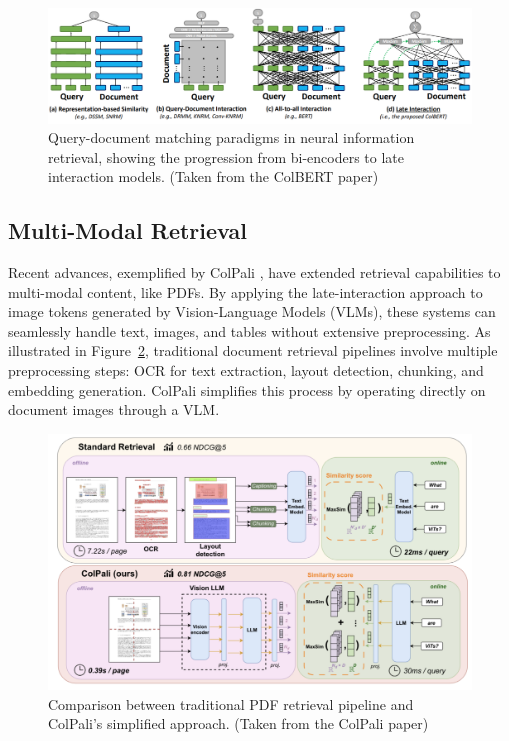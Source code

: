 \documentclass[notoc, tikz]{tufte-handout}
\begin{document}
\begin{figure}
\includegraphics[width=\textwidth]{colbert.png}
\caption{Query-document matching paradigms in neural information retrieval, showing the progression from bi-encoders to late interaction models. (Taken from the ColBERT paper)}
\label{fig:colbert}
\end{figure}
\subsection{Multi-Modal Retrieval}

Recent advances, exemplified by ColPali \citep{colpali}, have extended retrieval capabilities to multi-modal content, like PDFs. By applying the late-interaction approach to image tokens generated by Vision-Language Models (VLMs), these systems can seamlessly handle text, images, and tables without extensive preprocessing. 
As illustrated in Figure~\ref{fig:colpali}, traditional document retrieval pipelines involve multiple preprocessing steps: OCR for text extraction, layout detection, chunking, and embedding generation. ColPali simplifies this process by operating directly on document images through a VLM.

\begin{figure}
\includegraphics[width=\textwidth]{colpali.png}
\caption{Comparison between traditional PDF retrieval pipeline and ColPali's simplified approach. (Taken from the ColPali paper)}
\label{fig:colpali}
\end{figure}
\end{document}
